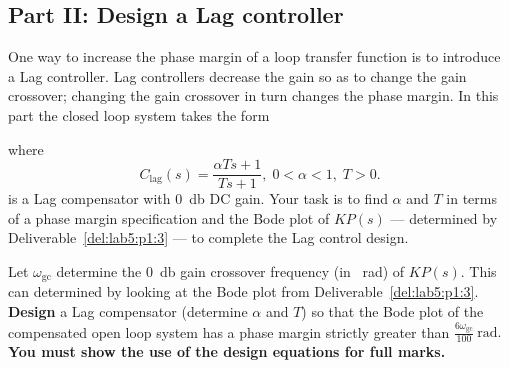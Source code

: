 \subsection{Part II: Design a Lag controller}
One way to increase the phase margin of a loop transfer function is to introduce a Lag controller.
Lag controllers decrease the gain so as to change the gain crossover;
changing the gain crossover in turn changes the phase margin.
In this part the closed loop system takes the form
%
\begin{center}
\end{center}
%
where
\[
  C_\mathrm{lag}(s)
    =
      \frac{\alpha T s + 1}{T s + 1}
  ,
  \;
  0 < \alpha < 1
  ,
  \;
  T > 0.
\]
is a Lag compensator with \SI{0}{\decibel} DC gain.
Your task is to find \(\alpha\) and \(T\) in terms of a phase margin specification and the Bode plot of \(K P(s)\) --- determined by Deliverable~\ref{del:lab5:p1:3} --- to complete the Lag control design.
%
\begin{deliverable}[label={del:lab5:p2:1}]
  Let \(\omega_\mathrm{gc}\) determine the \SI{0}{\decibel} gain crossover frequency (in \SI{}{\radian}) of \(K P(s).\)
  This can determined by looking at the Bode plot from Deliverable~\ref{del:lab5:p1:3}.
  \textbf{Design} a Lag compensator (determine \(\alpha\) and \(T\)) so that the Bode plot of the compensated open loop system has a phase margin strictly greater than \(\frac{6\omega_\mathrm{gc}}{100}~\mathrm{rad}.\)
  \textbf{You must show the use of the design equations for full marks.}
\end{deliverable}
